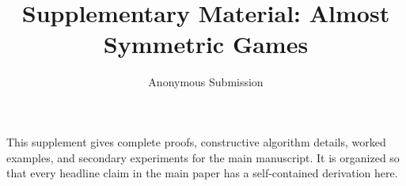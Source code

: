 \documentclass[letterpaper]{article}
\title{Supplementary Material: Almost Symmetric Games}
\author{Anonymous Submission}
\begin{document}
\maketitle

This supplement gives complete proofs, constructive algorithm details, worked examples, and secondary experiments for the main manuscript.  It is organized so that every headline claim in the main paper has a self-contained derivation here.










\end{document}
